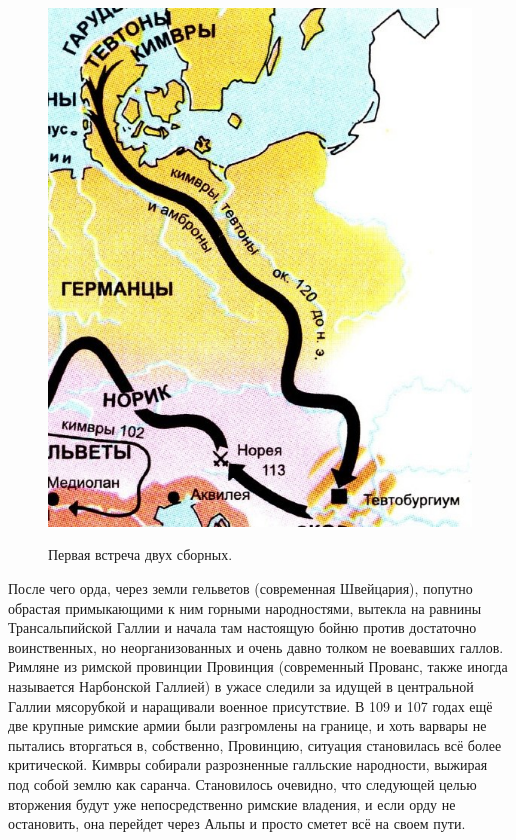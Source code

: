 \begin{figure}[h!tb]
	\centering\includegraphics[scale=0.45]{kimres/1574757799180321900.png}
	\label{fig:kimr1} %
	\caption{Первая встреча двух сборных. }
\end{figure}




После чего орда, через земли гельветов (современная Швейцария), попутно обрастая примыкающими к ним горными народностями, вытекла на равнины Трансальпийской Галлии и начала там настоящую бойню против достаточно воинственных, но неорганизованных и очень давно толком не воевавших галлов. Римляне из римской провинции Провинция (современный Прованс, также иногда называется Нарбонской Галлией) в ужасе следили за идущей в центральной Галлии мясорубкой и наращивали военное присутствие. В 109 и 107 годах ещё две крупные римские армии были разгромлены на границе, и хоть варвары не пытались вторгаться в, собственно, Провинцию, ситуация становилась всё более критической. Кимвры собирали разрозненные галльские народности, выжирая под собой землю как саранча. Становилось очевидно, что следующей целью вторжения будут уже непосредственно римские владения, и если орду не остановить, она перейдет через Альпы и просто сметет всё на своем пути.


